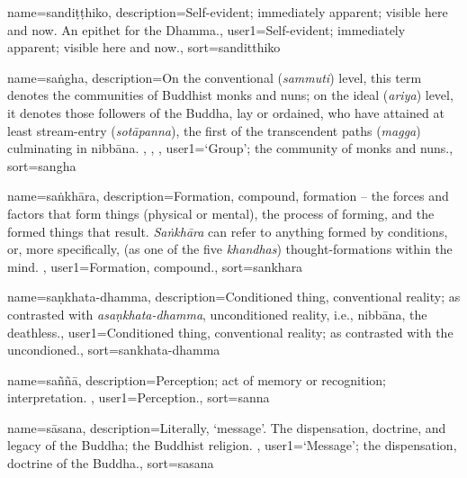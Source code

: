 {
name={sandi\d{t}\d{t}hiko},
description={Self-evident; immediately apparent; visible here and now. An epithet for the Dhamma.},
user1={Self-evident; immediately apparent; visible here and now.},
sort={sanditthiko}
}

{
name={sa\.ngha},
description={On the conventional (\textit{sammuti}) level, this term denotes the communities of Buddhist monks and nuns; on the ideal (\textit{ariya}) level, it denotes those followers of the Buddha, lay or ordained, who have attained at least stream-entry (\textit{sot\=apanna}), the first of the transcendent paths (\textit{magga}) culminating in nibb\=ana. \protect \seepre %
\protect {}, \protect {}, \protect {}%
\protect \seepost %
},
user1={`Group'; the community of monks and nuns.},
sort={sangha}
}

{
name={sa\.nkh\=ara},
description={Formation, compound, formation -- the forces and factors that form things (physical or mental), the process of forming, and the formed things that result. \textit{Sa\.nkh\=ara} can refer to anything formed by conditions, or, more specifically, (as one of the five \textit{khandhas}) thought-formations within the mind. \protect \seepre %
\protect {}%
\protect \seepost %
},
user1={Formation, compound.},
sort={sankhara}
}

{
name=sa\d{n}khata-dhamma,
description={Conditioned thing, conventional reality; as contrasted with \textit{asa\d{n}khata-dhamma}, unconditioned reality, i.e., nibb\=ana, the deathless.},
user1={Conditioned thing, conventional reality; as contrasted with the uncondioned.},
sort={sankhata-dhamma}
}

{
name={sa\~n\~n\=a},
description={Perception; act of memory or recognition; interpretation. \protect \seepre %
\protect {}%
\protect \seepost %
},
user1={Perception.},
sort={sanna}
}

{
name={s\=asana},
description={Literally, `message'. The dispensation, doctrine, and legacy of the Buddha; the Buddhist religion. \protect \seepre %
\protect {}%
\protect \seepost %
},
user1={`Message'; the dispensation, doctrine of the Buddha.},
sort={sasana}
}

